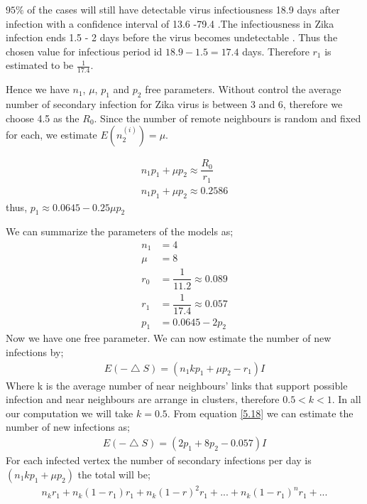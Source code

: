 $95\%$ of the cases will still have detectable virus infectiousness 18.9 days after infection with a confidence interval of 13.6 -79.4  \citep{lessler2016times}.The infectiousness in Zika infection ends 1.5 - 2 days before the virus becomes undetectable \citep{funk2016comparative}. Thus the chosen value for infectious period id $18.9 - 1.5 = 17.4$ days. Therefore $r_1$ is estimated  to be $\frac{1}{17.4}$.

Hence we have $n_1$, $\mu$, $p_1$ and $p_2$ free parameters. Without control the average number of secondary infection for Zika virus is between 3 and 6, therefore we choose 4.5 as the $R_0$. Since the number of remote neighbours is random and fixed for each, we estimate $E (n^{(i)}_2) = \mu$.

\begin{align}
n_1 p_1 + \mu p_2 \approx \dfrac{R_0}{r_1} 
\\ n_1 p_1 + \mu p_2 \approx 0.2586
\end{align}
thus, 
$p_1 \approx   0.0645- 0.25 \mu p_2$

We can summarize the parameters of the models as;
\begin{align}
n_1 &= 4 \\
\mu &= 8 \\
r_0 &= \dfrac{1}{11.2} \approx 0.089 \\
r_1 &= \dfrac{1}{17.4} \approx 0.057 \\
p_1 &= 0.0645 - 2 p_2 \label{eqn 5.1.7}
\end{align}
Now we have one free parameter. We can now estimate the number of new infections by;
\begin{align}
E(- \bigtriangleup S) = (n_1 k p_1 + \mu p_2 - r_1) I \label{5.18}
\end{align}
Where k is the average number of near neighbours' links that support possible infection and near neighbours are arrange in clusters, therefore $0.5 <k <1$. In all our computation we will take $k = 0.5$. From equation \ref{5.18} we can estimate the number of new infections as;
\begin{align}
E(- \bigtriangleup S) = (2 p_1 + 8 p_2 - 0.057) I  \label{5.1.9}
\end{align}
 For each infected vertex the number of secondary infections per day is $(n_1kp_1 + \mu p_2)$ the total will be;
 \begin{align}
 n_k r_1  + n_k(1-r_1)r_1 + n_k (1-r)^2 r_1 +...+ n_k(1-r_1)^n r_1 +... \label{eqn 5.1.10}
 \end{align}
 
